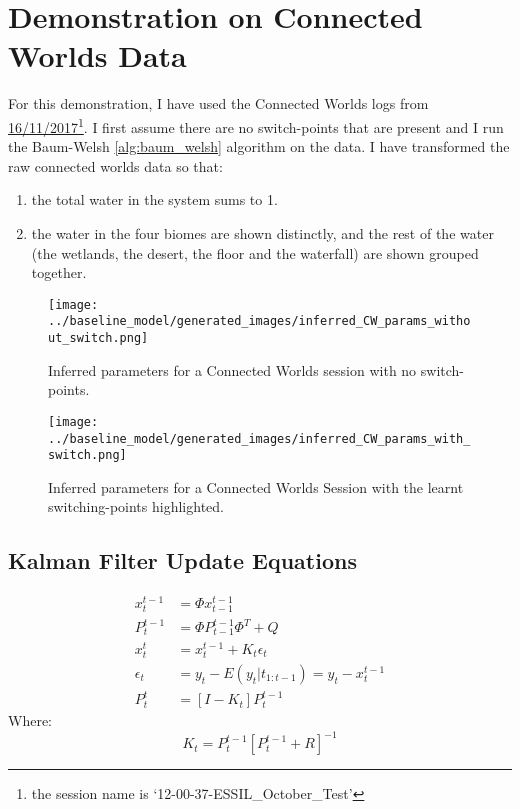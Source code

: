 \documentclass{article}
\begin{document}
\section{Demonstration on Connected Worlds Data}

For this demonstration, I have used the Connected Worlds logs from \href{https://drive.google.com/drive/u/0/folders/1pQE8-VWqh9YA59NYlRJaMmADx8CxNfU5}{16/11/2017}\footnote{the session name is `12-00-37-ESSIL\_October\_Test'}. I first assume there are no switch-points that are present and I run the Baum-Welsh \ref{alg:baum_welsh} algorithm on the data. I have transformed the raw connected worlds data so that:

\begin{enumerate}
\item the total water in the system sums to 1.
\item the water in the four biomes are shown distinctly, and the rest of the water (the wetlands, the desert, the floor and the waterfall) are shown grouped together.
\end{enumerate}

\begin{figure}
\center
\texttt{[image: ../baseline\_model/generated\_images/inferred\_CW\_params\_without\_switch.png]}
\caption{Inferred parameters for a Connected Worlds session with no switch-points.}\label{fig:inferred_CW_params_without_switch}
\end{figure}


\begin{figure}
\center
\texttt{[image: ../baseline\_model/generated\_images/inferred\_CW\_params\_with\_switch.png]}
\caption{Inferred parameters for a Connected Worlds Session with the learnt switching-points highlighted.}\label{fig:inferred_CW_params_with_switch}
\end{figure}

\begin{appendices}

  \section{Kalman Filter Update Equations}\label{kalman_filter_upadte_equations}

    \begin{align}\label{kalman_filter_eqns}
      x_t^{t-1} &= \Phi x_{t-1}^{t-1} \\
      P_t^{t-1} &= \Phi P_{t-1}^{t-1} \Phi^T + Q \\
      x_t^t &= x_t^{t-1} + K_t \epsilon_t \\
      \epsilon_t &= y_t - E(y_t \vert t_{1:t-1}) = y_t - x_t^{t-1} \\
      P_t^{t} &= [I - K_t]P_t^{t-1}
    \end{align}
    Where:
    \begin{equation}\label{kalman_filter_condition}
      K_t = P_t^{t-1}[P_t^{t-1}+ R]^{-1}
    \end{equation}
\end{appendices}



\end{document}
